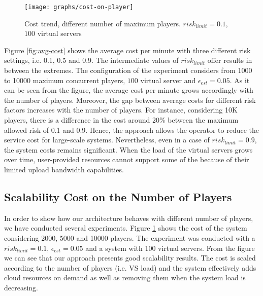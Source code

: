\documentclass[final,10pt,a5paper]{phdimt}
\theoremstyle{definition}
\begin{document}
\begin{figure}[tbh]
\centering
\texttt{[image: graphs/cost-on-player]}
\caption{Cost trend, different number of maximum players. $risk_{limit}=0.1$, $100$ virtual servers}
\label{fig:cost-on-player}
\end{figure}


Figure \ref{fig:avg-cost} shows the average cost per minute with three different risk settings, i.e. 0.1, 0.5 and 0.9. 
The intermediate values of $risk_{limit}$ offer results in between the extremes. The configuration of the experiment considers from 1000 to 10000 maximum concurrent players, $100$ virtual server and $\epsilon_{est}=0.05$. 
As it can be seen from the figure, the average cost per minute grows accordingly with the number of players. 
Moreover, the gap between average costs for different risk factors increases with the number of players.
For instance, considering 10K players, there is a difference in the cost around 20\% between the maximum allowed risk of 0.1 and 0.9.
Hence, the approach allows the operator to reduce the service cost for large-scale systems.
Nevertheless, even in a case of $risk_{limit} = 0.9$, the system costs remains significant. 
When the load of the virtual servers grows over time, user-provided resources cannot support some of the because of their limited upload bandwidth capabilities.









\subsection{Scalability Cost on the Number of Players}

In order to show how our architecture behaves with different number of players, we have conducted several experiments.
Figure \ref{fig:cost-on-player} shows the cost of the system considering 2000, 5000 and 10000 players. The experiment was conducted with a $risk_{limit} = 0.1$, $\epsilon_{est}=0.05$ and a system with 100 virtual servers.
From the figure we can see that our approach presents good scalability results. The cost is scaled according to the number of players (i.e. VS load) and the system effectively adds cloud resources on demand as well as removing them when the system load is decreasing.
\end{document}
